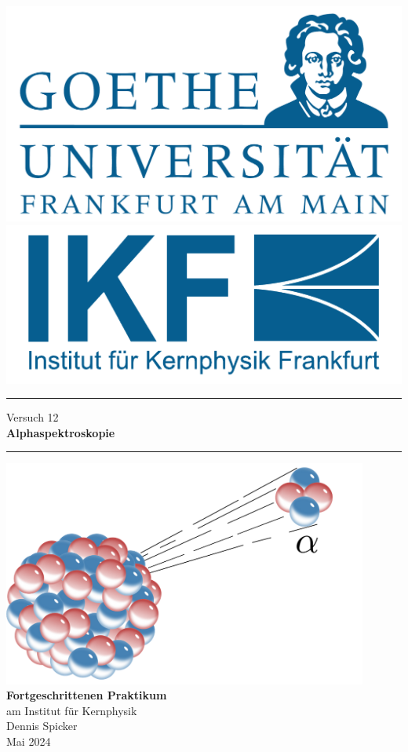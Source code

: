 \documentclass{scrartcl}
\begin{document}
\begin{titlepage}
	\newcommand{\HRule}{\rule{\textwidth}{0.5mm}}
	\begin{center}
	{\includegraphics[width=0.3\linewidth]{img/GU-Logo-blau-CMYK} \hfill
	\includegraphics[width=0.3\linewidth]{img/IKF_Logo} \\ }
	\vspace{1cm}
	\HRule
	\vspace{0.4cm}
	{\huge Versuch 12} \\
	\vspace{0.5cm}
	{\huge {\bfseries Alphaspektroskopie}} \\
	\vspace{0.2cm}
	\HRule
	\vfill
	\includegraphics[width=12cm]{img/front_cover.png}
	\vfill
	{\Large\bfseries Fortgeschrittenen Praktikum} \\
	\vspace{0.3cm}
	{\Large am Institut für Kernphysik} \\
	\vspace{1.5cm}
	{\small 
		Dennis Spicker \\
		Mai 2024
	}
	\end{center} 
	\thispagestyle{empty}
	\clearpage
\end{titlepage}

\tableofcontents
\clearpage
\end{document}
